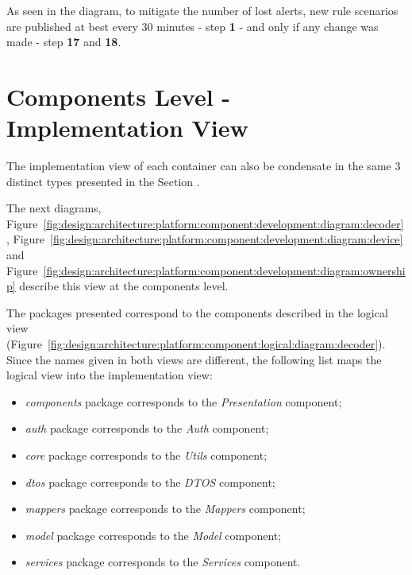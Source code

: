 As seen in the diagram, to mitigate the number of lost alerts, new rule scenarios are published at best every 30 minutes - step \textbf{1} - and only if any change was made - step \textbf{17} and \textbf{18}.

\section{Components Level - Implementation View}
\label{par:design:architecture:platform:components:development}

The implementation view of each container can also be condensate in the same 3 distinct types presented in the Section .

The next diagrams, Figure~\ref{fig:design:architecture:platform:component:development:diagram:decoder}, Figure~\ref{fig:design:architecture:platform:component:development:diagram:device} and Figure~\ref{fig:design:architecture:platform:component:development:diagram:ownership} describe this view at the components level.

%       

The packages presented correspond to the components described in the logical view (Figure~\ref{fig:design:architecture:platform:component:logical:diagram:decoder}). Since the names given in both views are different, the following list maps the logical view into the implementation view:

\begin{itemize}
   \item \textit{components} package corresponds to the \textit{Presentation} component;
   \item \textit{auth} package corresponds to the \textit{Auth} component;
   \item \textit{core} package corresponds to the \textit{Utils} component;
   \item \textit{dtos} package corresponds to the \textit{DTOS} component;
   \item \textit{mappers} package corresponds to the \textit{Mappers} component;
   \item \textit{model} package corresponds to the \textit{Model} component;
   \item \textit{services} package corresponds to the \textit{Services} component.
\end{itemize}

